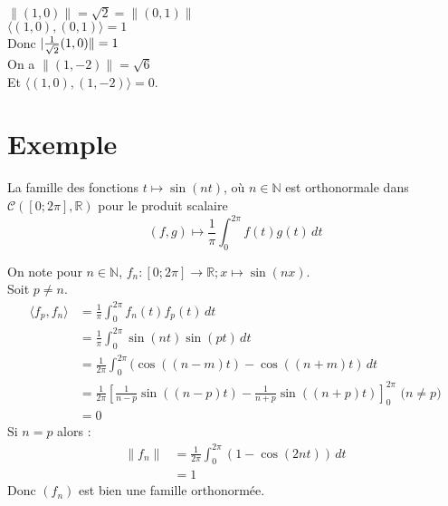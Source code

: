 \documentclass[../main.tex]{subfiles}
\begin{document}
\noindent $\| (1, 0)\| = \sqrt{2} = \| (0, 1)\|$ \\
$\langle (1, 0), (0, 1)\rangle = 1$ \\
Donc $\\| \frac{1}{\sqrt{2}}(1, 0)\| = 1$ \\
On a $\| (1, -2)\| = \sqrt{6}$ \\
Et $\langle (1, 0), (1, -2)\rangle = 0$. 

\section{Exemple}
\begin{tcolorbox}[title=Exemple 34.23, title filled=false, colframe=darkgreen, colback=darkgreen!10!white]
    La famille des fonctions $t \mapsto \sin (n t)$, où $n \in \mathbb{N}$ est orthonormale dans $\mathcal{C}([0 ; 2 \pi], \mathbb{R})$ pour le produit scalaire
    $$(f, g) \mapsto \frac{1}{\pi} \int_0^{2 \pi} f(t) g(t) \,dt$$
\end{tcolorbox}

\noindent On note pour $n\in \mathbb{N}$, $f_n: [0 ; 2\pi] \to \mathbb{R};x\mapsto \sin(nx)$. \\
Soit $p\neq n$. \\
\begin{align*}
    \langle f_p, f_n \rangle &= \frac{1}{\pi} \int_{0}^{2\pi} f_n(t) f_p(t) \,dt \\
    &= \frac{1}{\pi} \int_{0}^{2\pi} \sin(nt) \sin(pt) \,dt \\
    &= \frac{1}{2\pi} \int_{0}^{2\pi} (\cos((n-m)t) - \cos((n+m)t) \,dt \\
    &= \frac{1}{2\pi} \left[ \frac{1}{n-p} \sin((n-p)t) - \frac{1}{n+p}\sin((n+p)t) \right]^{2\pi}_0 \text{ ($n\neq p$)} \\
    &= 0
\end{align*}
Si $n = p$ alors : 
\begin{align*}
    \|f_n\| &= \frac{1}{2\pi} \int_{0}^{2\pi} (1 - \cos(2nt)) \,dt \\
    &= 1
\end{align*}
Donc $(f_n)$ est bien une famille orthonormée. 
\end{document}
